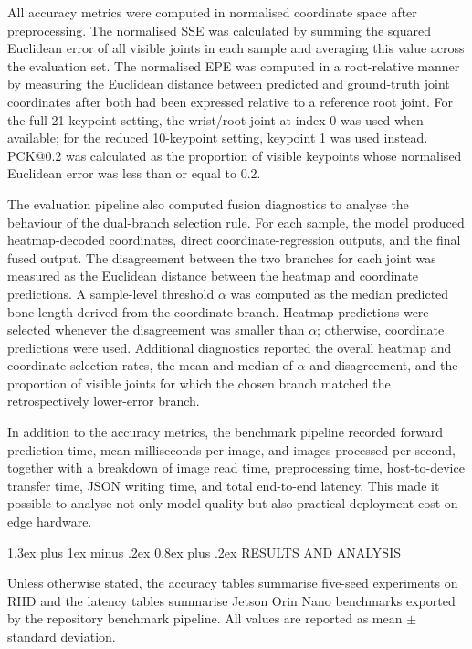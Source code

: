 \documentclass[10pt,letterpaper,twocolumn]{article}
\makeatletter
\renewcommand\section{\@startsection{section}{1}{\z@}%
  {1.3ex plus 1ex minus .2ex}%
  {0.8ex plus .2ex}%
  {\centering\normalfont\small\scshape}}
\makeatother
\begin{document}
All accuracy metrics were computed in normalised coordinate space after preprocessing. The normalised SSE was calculated by summing the squared Euclidean error of all visible joints in each sample and averaging this value across the evaluation set. The normalised EPE was computed in a root-relative manner by measuring the Euclidean distance between predicted and ground-truth joint coordinates after both had been expressed relative to a reference root joint. For the full 21-keypoint setting, the wrist/root joint at index 0 was used when available; for the reduced 10-keypoint setting, keypoint 1 was used instead. PCK@0.2 was calculated as the proportion of visible keypoints whose normalised Euclidean error was less than or equal to 0.2.

The evaluation pipeline also computed fusion diagnostics to analyse the behaviour of the dual-branch selection rule. For each sample, the model produced heatmap-decoded coordinates, direct coordinate-regression outputs, and the final fused output. The disagreement between the two branches for each joint was measured as the Euclidean distance between the heatmap and coordinate predictions. A sample-level threshold $\alpha$ was computed as the median predicted bone length derived from the coordinate branch. Heatmap predictions were selected whenever the disagreement was smaller than $\alpha$; otherwise, coordinate predictions were used. Additional diagnostics reported the overall heatmap and coordinate selection rates, the mean and median of $\alpha$ and disagreement, and the proportion of visible joints for which the chosen branch matched the retrospectively lower-error branch.

In addition to the accuracy metrics, the benchmark pipeline recorded forward prediction time, mean milliseconds per image, and images processed per second, together with a breakdown of image read time, preprocessing time, host-to-device transfer time, JSON writing time, and total end-to-end latency. This made it possible to analyse not only model quality but also practical deployment cost on edge hardware.

\section{RESULTS AND ANALYSIS}

Unless otherwise stated, the accuracy tables summarise five-seed experiments on RHD and the latency tables summarise Jetson Orin Nano benchmarks exported by the repository benchmark pipeline. All values are reported as mean $\pm$ standard deviation.
\end{document}
